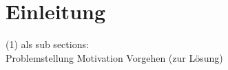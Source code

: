 \section{Einleitung} \label{sec:Einleitung}
    (1)
    als sub sections:\\
    Problemstellung
    Motivation
    Vorgehen (zur Lösung)